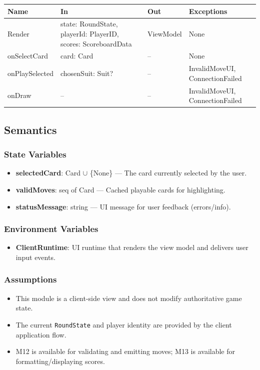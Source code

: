 \documentclass[12pt, titlepage]{article}
\begin{document}
\begin{center}
    \begin{tabular}{p{4.5cm} p{5cm} p{3.5cm} p{3.5cm}}
        \toprule
        \textbf{Name} & \textbf{In} & \textbf{Out} & \textbf{Exceptions} \\
        \midrule
        Render & state: RoundState, playerId: PlayerID, scores: ScoreboardData & ViewModel & None \\
        onSelectCard & card: Card & -- & None \\
        onPlaySelected & chosenSuit: Suit? & -- & InvalidMoveUI, ConnectionFailed \\
        onDraw & -- & -- & InvalidMoveUI, ConnectionFailed \\
        \bottomrule
    \end{tabular}
\end{center}

\subsection{Semantics}

\subsubsection{State Variables}
\begin{itemize}
    \item \textbf{selectedCard}: Card $\cup$ \{None\} --- The card currently selected by the user.
    \item \textbf{validMoves}: seq of Card --- Cached playable cards for highlighting.
    \item \textbf{statusMessage}: string --- UI message for user feedback (errors/info).
\end{itemize}

\subsubsection{Environment Variables}
\begin{itemize}
    \item \textbf{ClientRuntime}: UI runtime that renders the view model and delivers user input events.
\end{itemize}

\subsubsection{Assumptions}
\begin{itemize}
    \item This module is a client-side view and does not modify authoritative game state.
    \item The current \texttt{RoundState} and player identity are provided by the client application flow.
    \item M12 is available for validating and emitting moves; M13 is available for formatting/displaying scores.
\end{itemize}
\end{document}
